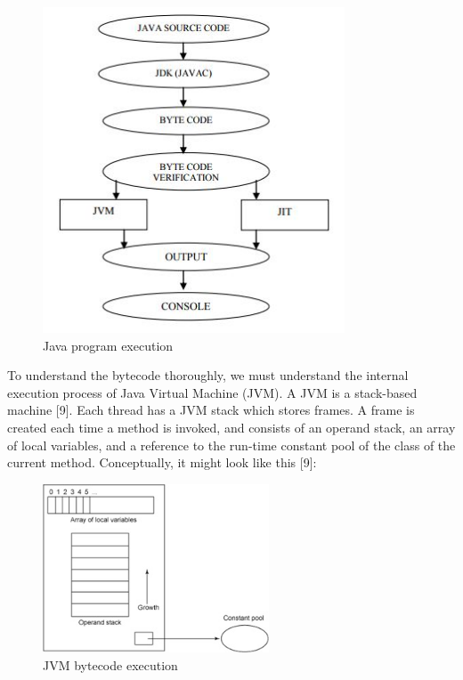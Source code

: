 \begin{figure}[htb]
\centering
\includegraphics[width=0.8\textwidth]{images/jvm.jpg}
\caption{Java program execution} 
\label{fig:Java program execution}
\end{figure}
\break

To understand the bytecode thoroughly, we must understand the internal execution process of Java Virtual Machine (JVM). A JVM is a stack-based machine [9]. Each thread has a JVM stack which stores frames. A frame is created each time a method is invoked, and consists of an operand stack, an array of local variables, and a reference to the run-time constant pool of the class of the current method. Conceptually, it might look like this [9]:

\begin{figure}[htb]
\centering
\includegraphics[width=0.6\textwidth]{images/frame.jpg}
\caption{JVM bytecode execution} 
\label{fig:JVM bytecode execution}
\end{figure}
\break

